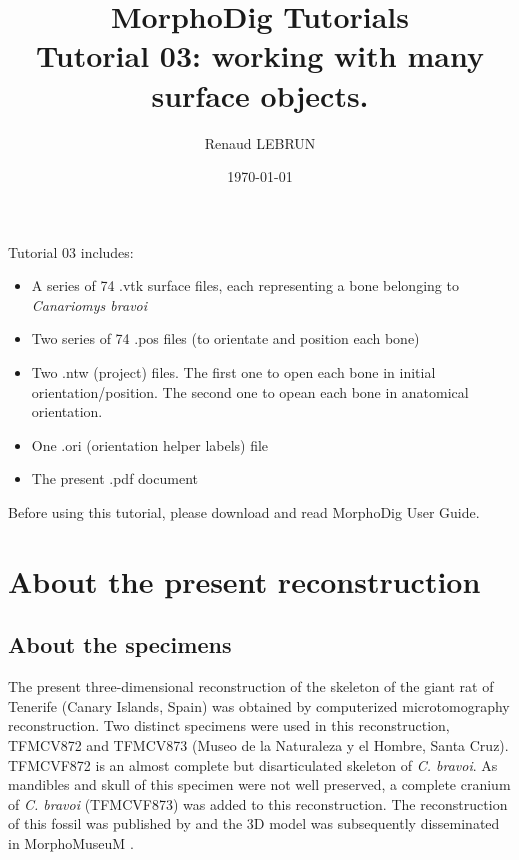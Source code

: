 \documentclass[12pt, a4paper]{book}
\title{MorphoDig Tutorials\\Tutorial 03: working with many surface objects.}
\author{Renaud LEBRUN}
\affil{Institut des Sciences de l'Evolution, Université de Montpellier, France}
\date{\today}
\begin{document}
\dominitoc	

\maketitle

\faketableofcontents



\minitoc 
Tutorial 03 includes:
\begin{itemize}
\item A series of 74 .vtk surface files, each representing a bone belonging to \textit{Canariomys bravoi}
\item Two series of 74 .pos files (to orientate and position each bone)
\item Two .ntw (project) files. The first one to open each bone in initial orientation/position. The second one to opean each bone in anatomical orientation.
\item One .ori (orientation helper labels) file 
\item The present .pdf document
\end{itemize}

Before using this tutorial, please download and read MorphoDig User Guide.


\section{About the present reconstruction}
\subsection{About the specimens}
The present three-dimensional reconstruction of the skeleton of the giant rat of Tenerife (Canary
Islands, Spain) was obtained by computerized microtomography reconstruction. Two distinct specimens
were used in this reconstruction, TFMCV872 and TFMCV873 (Museo de la Naturaleza y el
Hombre, Santa Cruz). TFMCVF872 is an almost complete but disarticulated skeleton of \textit{C. bravoi}. As
mandibles and skull of this specimen were not well preserved, a complete cranium of \textit{C. bravoi} (TFMCVF873)
was added to this reconstruction. The reconstruction of this fossil was published by \citet{Michaux2012} and the 3D model was subsequently disseminated  in MorphoMuseuM \citep{MichauxJ2015}.\\
\end{document}
